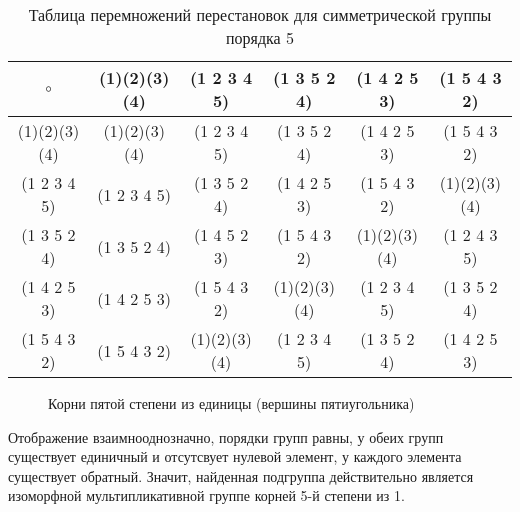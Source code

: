 \documentclass{article}
\begin{document}
\begin{table}[h]
\centering
\caption{Таблица перемножений перестановок для симметрической группы порядка 5}
\label{tab:permutations}
\begin{tabular}{c|c c c c c}
$\circ$ & (1)(2)(3)(4) & (1 2 3 4 5) & (1 3 5 2 4) & (1 4 2 5 3) & (1 5 4 3 2) \\
\hline
(1)(2)(3)(4) & (1)(2)(3)(4) & (1 2 3 4 5) & (1 3 5 2 4) & (1 4 2 5 3) & (1 5 4 3 2) \\
(1 2 3 4 5) & (1 2 3 4 5) & (1 3 5 2 4) & (1 4 2 5 3) & (1 5 4 3 2) & (1)(2)(3)(4) \\
(1 3 5 2 4) & (1 3 5 2 4) & (1 4 5 2 3) & (1 5 4 3 2) & (1)(2)(3)(4) & (1 2 4 3 5) \\
(1 4 2 5 3) & (1 4 2 5 3) & (1 5 4 3 2) & (1)(2)(3)(4) & (1 2 3 4 5) & (1 3 5 2 4) \\
(1 5 4 3 2) & (1 5 4 3 2) & (1)(2)(3)(4) & (1 2 3 4 5) & (1 3 5 2 4) & (1 4 2 5 3) \\
\end{tabular}
\end{table}

\begin{figure}[h]
  \centering
  \caption{Корни пятой степени из единицы (вершины пятиугольника)}
  \label{fig:roots_of_unity}
\end{figure}

Отображение взаимнооднозначно, порядки групп равны, у обеих групп существует единичный и отсутсвует нулевой элемент, у каждого элемента существует обратный.
Значит, найденная подгруппа действительно является изоморфной мультипликативной группе корней 5-й степени из 1.
\end{document}
